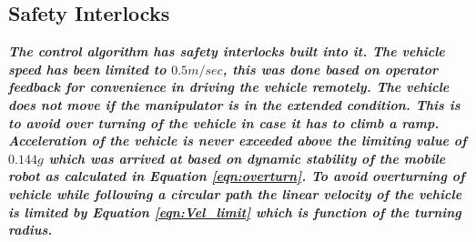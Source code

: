  
\subsection{Safety Interlocks}
\textbf{\textit{The control algorithm has safety interlocks built into it. The vehicle speed has been limited to $0.5m/sec$, this was done based on operator feedback for convenience in driving the vehicle remotely. The vehicle does not move if the manipulator is in the extended condition. This is to avoid over turning of the vehicle in case it has to climb a ramp. Acceleration of the vehicle is never exceeded above the limiting value of  $0.144g$ which was arrived at  based on dynamic stability of the mobile robot as calculated in Equation \ref{eqn:overturn}. To avoid overturning of vehicle while following a circular path the linear velocity of the vehicle is limited by Equation \ref{eqn:Vel_limit} which is function of the turning radius.}}
